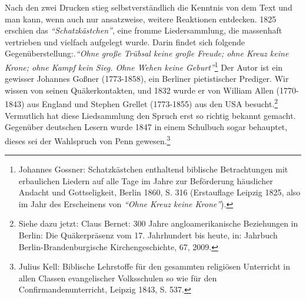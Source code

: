 Nach den zwei Drucken stieg selbstverständlich die Kenntnis von dem Text und man
kann, wenn auch nur ansatzweise, weitere Reaktionen entdecken. 1825 erschien das
\textit{"`Schatzkästchen"'}, eine fromme Liedersammlung, die massenhaft vertrieben und
vielfach aufgelegt wurde. Darin findet sich folgende Gegenüberstellung:.\textit{"`Ohne
große Trübsal keine große Freude; ohne Kreuz keine Krone; ohne Kampf kein Sieg.
Ohne Wehen keine Geburt"'}\footnote{Johannes Gossner: Schatzkästchen enthaltend
biblische Betrachtungen mit
erbaulichen Liedern auf alle Tage im Jahre zur Beförderung häuslicher Andacht
und Gottseligkeit, Berlin 1860, S. 316 (Erstauflage Leipzig 1825, also im Jahr
des Erscheinens von \textit{"`Ohne Kreuz keine Krone"'}).} Der Autor ist ein gewisser
Johannes Goßner (1773-1858), ein Berliner pietistischer Prediger. Wir wissen von
seinen Quäkerkontakten, und 1832 wurde er von William Allen (1770-1843) aus
England und Stephen Grellet (1773-1855) aus den USA besucht.\footnote{Siehe dazu
jetzt: Claus Bernet: 300 Jahre angloamerikanische Beziehungen in
Berlin: Die Quäkerpräsenz vom 17. Jahrhundert bis heute, in: Jahrbuch
Berlin-Brandenburgische Kirchengeschichte, 67, 2009.} Vermutlich hat diese
Liedsammlung den Spruch erst so richtig bekannt gemacht. Gegenüber deutschen
Lesern wurde 1847 in einem Schulbuch sogar behauptet, dieses sei der Wahlspruch
von Penn gewesen.\footnote{Julius Kell: Biblische Lehrstoffe für den gesammten
religiösen Unterricht
in allen Classen evangelischer Volksschulen so wie für den
Confirmandenunterricht, Leipzig 1843, S. 537.}

\medskip

